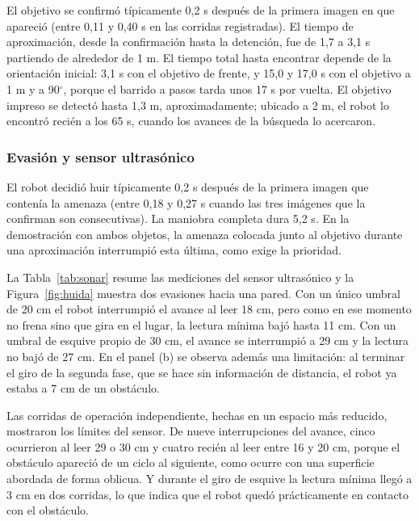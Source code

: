 \documentclass[pdflatex,sn-mathphys-num]{sn-jnl}
\newcommand{\grad}{\ensuremath{^\circ}}
\begin{document}
El objetivo se confirm\'o t\'ipicamente 0,2 s despu\'es de la primera imagen
en que apareci\'o (entre 0,11 y 0,40 s en las corridas registradas). El tiempo de aproximaci\'on, desde la confirmaci\'on hasta
la detenci\'on, fue de 1,7 a 3,1 s partiendo de alrededor de 1 m. El tiempo
total hasta encontrar depende de la orientaci\'on inicial: 3,1 s con el
objetivo de frente, y 15,0 y 17,0 s con el objetivo a 1 m y a 90\grad, porque
el barrido a pasos tarda unos 17 s por vuelta. El objetivo impreso se
detect\'o hasta 1,3 m, aproximadamente; ubicado a 2 m, el robot lo
encontr\'o reci\'en a los 65 s, cuando los avances de la b\'usqueda lo
acercaron.

\subsubsection{Evasi\'on y sensor ultras\'onico}

El robot decidi\'o huir t\'ipicamente 0,2 s despu\'es de la primera imagen que
conten\'ia la amenaza (entre 0,18 y 0,27 s cuando las tres im\'agenes que la
confirman son consecutivas). La maniobra completa dura 5,2 s. En la demostraci\'on con ambos objetos, la amenaza
colocada junto al objetivo durante una aproximaci\'on interrumpi\'o esta
\'ultima, como exige la prioridad.

La Tabla~\ref{tab:sonar} resume las mediciones del sensor ultras\'onico y la
Figura~\ref{fig:huida} muestra dos evasiones hacia una pared. Con un \'unico
umbral de 20 cm el robot interrumpi\'o el avance al leer 18 cm, pero como en
ese momento no frena sino que gira en el lugar, la lectura m\'inima baj\'o
hasta 11 cm. Con un umbral de esquive propio de 30 cm, el avance se
interrumpi\'o a 29 cm y la lectura no baj\'o de 27 cm. En el panel (b) se
observa adem\'as una limitaci\'on: al terminar el giro de la segunda fase, que
se hace sin informaci\'on de distancia, el robot ya estaba a 7 cm de un
obst\'aculo.

Las corridas de operaci\'on independiente, hechas en un espacio m\'as
reducido, mostraron los l\'imites del sensor. De nueve interrupciones del
avance, cinco ocurrieron al leer 29 o 30 cm y cuatro reci\'en al leer entre 16
y 20 cm, porque el obst\'aculo apareci\'o de un ciclo al siguiente, como ocurre
con una superficie abordada de forma oblicua. Y durante el giro de esquive la
lectura m\'inima lleg\'o a 3 cm en dos corridas, lo que indica que el robot
qued\'o pr\'acticamente en contacto con el obst\'aculo.
\end{document}
